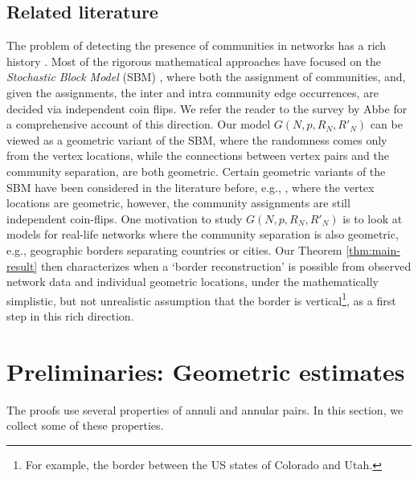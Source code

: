 \documentclass[ECP,preprint]{ejpecp} %
\newcommand{\1}{\mathbf 1}
\begin{document}
\subsection{Related literature} The problem of detecting the presence of communities in networks has a rich history \cite{fortunato2010community,fortunato2016community,lancichinetti2009community,leskovec2010empirical,yang2016comparative,magnani2021community,verzelen2015community}. Most of the rigorous mathematical approaches have focused on the \emph{Stochastic Block Model} (SBM) \cite{mossel2012stochastic, lee2019review, decelle2011asymptotic, deshpande2018contextual, funke2019stochastic}, where both the assignment of communities, and, given the assignments, the inter and intra community edge occurrences, are decided via independent coin flips. We refer the reader to the survey by Abbe \cite{abbe2018community} for a comprehensive account of this direction. Our model $G(N,p,R_N,R'_N)$ can be viewed as a geometric variant of the SBM, where the randomness comes only from the vertex locations, while the connections between vertex pairs and the community separation, are both geometric. Certain geometric variants of the SBM have been considered in the literature before, e.g., \cite{gaudio2024exact,avrachenkov2024community,gaudio2025exact,abbe2021community, sankararaman2018community}, where the vertex locations are geometric, however, the community assignments are still independent coin-flips. One motivation to study $G(N,p,R_N,R'_N)$ is to look at models for real-life networks where the community separation is also geometric, e.g., geographic borders separating countries or cities. Our Theorem \ref{thm:main-result} then characterizes when a `border reconstruction' is possible from observed network data and individual geometric locations, under the mathematically simplistic, but not unrealistic assumption that the border is vertical\footnote{For example, the border between the US states of Colorado and Utah.}, as a first step in this rich direction.


\section{Preliminaries: Geometric estimates}

The proofs use several properties of annuli and annular pairs. In this section, we collect some of these properties. 
\end{document}
